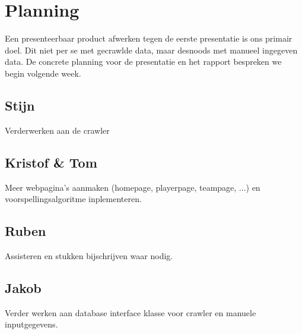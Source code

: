 \documentclass[11pt, a4paper]{article}
\begin{document}
\section{Planning}
Een presenteerbaar product afwerken tegen de eerste presentatie is ons primair doel. Dit niet per se met gecrawlde data, maar desnoods met manueel ingegeven data.
De concrete planning voor de presentatie en het rapport bespreken we begin volgende week.
\subsection{Stijn}
Verderwerken aan de crawler
\subsection{Kristof \& Tom}
Meer webpagina's aanmaken (homepage, playerpage, teampage, ...) en voorspellingsalgoritme inplementeren.
\subsection{Ruben}
Assisteren en stukken bijschrijven waar nodig. 
\subsection{Jakob}
Verder werken aan database interface klasse voor crawler en manuele inputgegevens.
\end{document}
